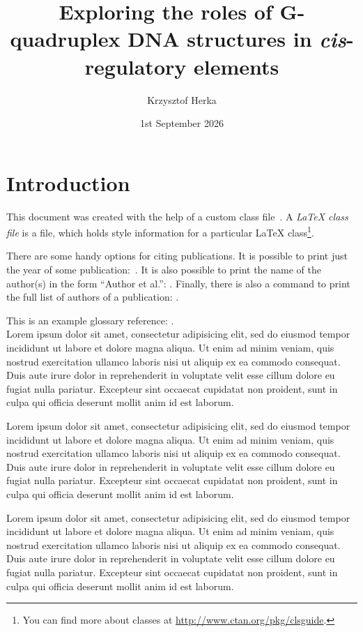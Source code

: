 \documentclass[withindex,glossary]{cam-thesis}
\title{Exploring the roles of G-quadruplex DNA structures in \textit{cis}-regulatory elements}
\author{Krzysztof Herka}
\date{1st September 2026}
\begin{document}
\frontmatter{}



\chapter{Introduction}
This document was created with the help of a custom class file~\cite{example}. A
{\em \LaTeX{} class file} is a file,
which holds style information for a particular \LaTeX{} class\footnote{You can
find more about classes at \url{http://www.ctan.org/pkg/clsguide}.}.

There are some handy options for citing publications. It is possible to print just the year of some publication:~\citeyear{example}. It is also possible to print the name of the author(s) in the form ``Author et al.'': \citeauthor{example}. Finally, there is also a command to print the full list of authors of a publication: \citet*{example}.

This is an example glossary reference: . \\
 
Lorem ipsum dolor sit amet, consectetur adipisicing elit, sed do eiusmod tempor incididunt ut labore et dolore magna aliqua. Ut enim ad minim veniam, quis nostrud exercitation ullamco laboris nisi ut aliquip ex ea commodo consequat. Duis aute irure dolor in reprehenderit in voluptate velit esse cillum dolore eu fugiat nulla pariatur. Excepteur sint occaecat cupidatat non proident, sunt in culpa qui officia deserunt mollit anim id est laborum.

Lorem ipsum dolor sit amet, consectetur adipisicing elit, sed do eiusmod tempor incididunt ut labore et dolore magna aliqua. Ut enim ad minim veniam, quis nostrud exercitation ullamco laboris nisi ut aliquip ex ea commodo consequat. Duis aute irure dolor in reprehenderit in voluptate velit esse cillum dolore eu fugiat nulla pariatur. Excepteur sint occaecat cupidatat non proident, sunt in culpa qui officia deserunt mollit anim id est laborum.

Lorem ipsum dolor sit amet, consectetur adipisicing elit, sed do eiusmod tempor incididunt ut labore et dolore magna aliqua. Ut enim ad minim veniam, quis nostrud exercitation ullamco laboris nisi ut aliquip ex ea commodo consequat. Duis aute irure dolor in reprehenderit in voluptate velit esse cillum dolore eu fugiat nulla pariatur. Excepteur sint occaecat cupidatat non proident, sunt in culpa qui officia deserunt mollit anim id est laborum.
\end{document}
